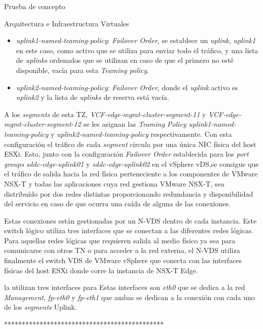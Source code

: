 \begin{section}{Prueba de concepto}
\begin{subsection}{Arquitectura e Infraestructura Virtuales\cite{CFVirtInfraes}}
\begin{itemize}
\begin{itemize}
      \item \textit{uplink1-named-teaming-policy}: \textit{Failover Order}, se establece un \textit{uplink}, \textit{uplink1} en este caso, como activo que se utiliza para enviar todo el tráfico, y una lista de \textit{uplinks} ordenados que se utilizan en caso de que el primero no esté disponible, vacía para esta \textit{Teaming policy}.
      \item \textit{uplink2-named-teaming-policy}: \textit{Failover Order}, donde el \textit{uplink} activo es \textit{uplink2} y la lista de \textit{uplinks} de reserva está vacía.
    \end{itemize}
\end{itemize}
A los \textit{segments} de esta TZ, \textit{VCF-edge-mgmt-cluster-segment-11} y \textit{VCF-edge-mgmt-cluster-segment-12} se les asignan las \textit{Teaming Policy} \textit{uplink1-named-teaming-policy} y \textit{uplink2-named-teaming-policy} respectivamente. Con esta configuración el tráfico de cada \textit{segment} circula por una única NIC física del host ESXi. Esto, junto con la configuración \textit{Failover Order} establecida para los \textit{port groups} \textit{sddc-edge-uplink01} y \textit{sddc-edge-uplink02} en el vSphere vDS,se consigue que el tráfico de salida hacia la red física perteneciente a los componentes de VMware NSX-T y todas las aplicaciones cuya red gestiona VMware NSX-T, sea distribuído por dos redes distintas proporcionando redundancia y disponibilidad del servicio en caso de que ocurra una caída de alguna de las conexiones.



Estas conexiones están gestionadas por un N-VDS dentro de cada instancia. Este switch lógico utiliza tres interfaces que se conectan a las diferentes redes lógicas. Para aquellas redes lógicas que requieren salida al medio físico ya sea para comunicarse con otros TN o para acceder a la red externa, el N-VDS utiliza finalmente el switch VDS de VMware vSphere que conecta con las interfaces físicas del host ESXi donde corre la instancia de NSX-T Edge.

la utilizan tres interfaces para  Estas interfaces son \textit{eth0} que se dedica a la red \textit{Management}, \textit{fp-eth0} y \textit{fp-eth1} que ambas se dedican a la conexión con cada uno de los \textit{segments} Uplink. 


*********************************************



\end{subsection}
\end{section}
